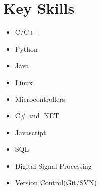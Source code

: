 \documentclass[a4paper,10pt]{article} %
\begin{document}

\section{Key Skills}

\begin{multicols}{2}
\begin{itemize}
    \item C/C++
    \item Python
    \item Java
    \item Linux
    \item Microcontrollers
    \item C\# and .NET
    \item Javascript
    \item SQL 
    \item Digital Signal Processing
    \item Version Control(Git/SVN)

\end{itemize}
\end{multicols}



\end{document}
